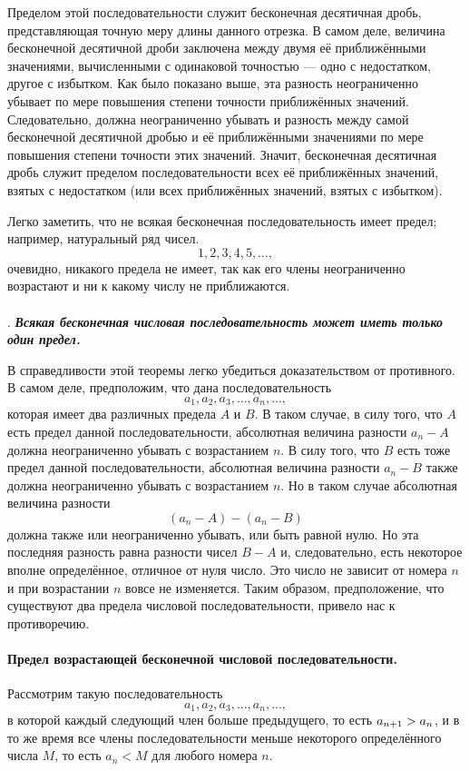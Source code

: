 Пределом этой последовательности служит бесконечная десятичная дробь, представляющая точную меру длины данного отрезка.
В самом деле, величина бесконечной десятичной дроби заключена между двумя её приближёнными значениями, вычисленными с одинаковой точностью — одно с недостатком, другое с избытком. 
Как было показано выше, эта разность неограниченно убывает по мере повышения степени точности приближённых значений.
Следовательно, должна неограниченно убывать и разность между самой бесконечной десятичной дробью и её приближёнными значениями по мере повышения степени точности этих значений.
Значит, бесконечная десятичная дробь служит пределом последовательности всех её приближённых значений, взятых с недостатком (или всех приближённых значений, взятых с избытком).

Легко заметить, что не всякая бесконечная последовательность имеет предел;
например, натуральный ряд чисел.
\[1, 2, 3, 4, 5,\dots,\]
очевидно, никакого предела не имеет, так как его члены неограниченно возрастают и ни к какому числу не приближаются.

\paragraph{}\label{1938/228}
.
\textbf{\emph{Всякая бесконечная числовая последовательность может иметь только один предел.}}

В справедливости этой теоремы легко убедиться доказательством от противного.
В самом деле, предположим, что дана последовательность
\[a_1,a_2,a_3,\dots,a_n,\dots,\]
которая имеет два различных предела $A$ и $B$.
В таком случае, в силу того, что $A$ есть предел данной последовательности, абсолютная величина разности $a_n-A$ должна неограниченно убывать с возрастанием $n$.
В силу того, что $B$ есть тоже предел данной последовательности, абсолютная величина разности $a_n-B$ также должна неограниченно убывать с возрастанием $n$.
Но в таком случае абсолютная величина разности
\[(a_n-A)-(a_n-B)\]
должна также или неограниченно убывать, или быть равной нулю.
Но эта последняя разность равна разности чисел $B-A$ и, следовательно, есть некоторое вполне определённое, отличное от нуля число.
Это число не зависит от номера $n$ и при возрастании $n$ вовсе не изменяется.
Таким образом, предположение, что существуют два предела числовой последовательности, привело нас к противоречию.
{\sloppy 
\paragraph{Предел возрастающей бесконечной числовой последовательности.}\label{1938/229}
Рассмотрим такую последовательность 
\[a_1, a_2, a_3,\dots,a_n,\dots,\]
в которой каждый следующий член больше предыдущего, то есть $a_{n+1} \z> a_n$, и в то же время все члены последовательности меньше некоторого определённого числа $M$, то есть $a_n < M$ для любого номера $n$.

}

